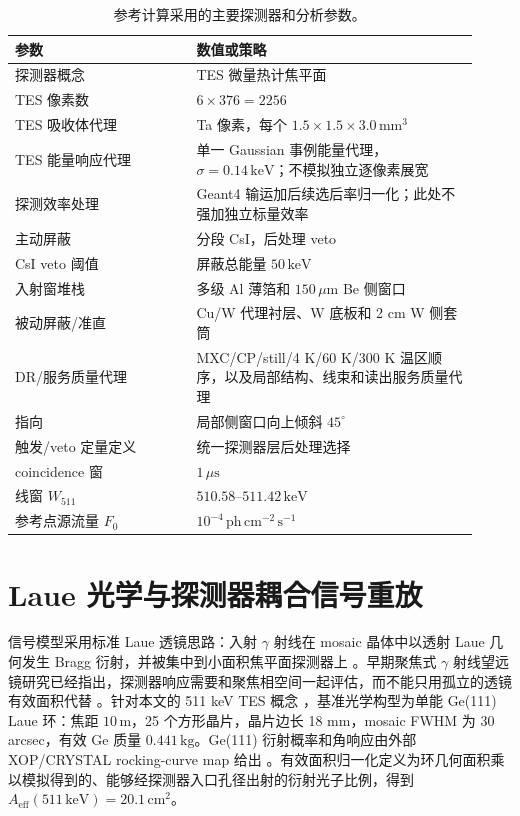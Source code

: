 \documentclass[preprint,12pt]{elsarticle}
\newcommand{\keV}{\,\mathrm{keV}}
\newcommand{\phcms}{\,\mathrm{ph\,cm^{-2}\,s^{-1}}}
\newcommand{\wii}{W_{511}}
\newcommand{\aeff}{A_{\mathrm{eff}}}
\newcommand{\fzero}{F_{0}}
\begin{document}
\begin{table}[t]
\centering
\caption{参考计算采用的主要探测器和分析参数。}
\label{tab:geometry}
\begin{tabular}{p{0.36\linewidth}p{0.56\linewidth}}
\toprule
参数 & 数值或策略 \\
\midrule
探测器概念 & TES 微量热计焦平面 \\
TES 像素数 & $6\times376=2256$ \\
TES 吸收体代理 & Ta 像素，每个 $1.5\times1.5\times3.0\,\mathrm{mm^3}$ \\
TES 能量响应代理 & 单一 Gaussian 事例能量代理，$\sigma=0.14\keV$；不模拟独立逐像素展宽 \\
探测效率处理 & Geant4 输运加后续选后率归一化；此处不强加独立标量效率 \\
主动屏蔽 & 分段 CsI，后处理 veto \\
CsI veto 阈值 & 屏蔽总能量 $50\keV$ \\
入射窗堆栈 & 多级 Al 薄箔和 $150\,\mu\mathrm{m}$ Be 侧窗口 \\
被动屏蔽/准直 & Cu/W 代理衬层、W 底板和 2 cm W 侧套筒 \\
DR/服务质量代理 & MXC/CP/still/4 K/60 K/300 K 温区顺序，以及局部结构、线束和读出服务质量代理 \\
指向 & 局部侧窗口向上倾斜 $45^\circ$ \\
触发/veto 定量定义 & 统一探测器层后处理选择 \\
coincidence 窗 & $1\,\mu\mathrm{s}$ \\
线窗 $\wii$ & $510.58$--$511.42\keV$ \\
参考点源流量 $\fzero$ & $10^{-4}\phcms$ \\
\bottomrule
\end{tabular}
\end{table}

\FloatBarrier

\section{Laue 光学与探测器耦合信号重放}
\label{sec:optics}

信号模型采用标准 Laue 透镜思路：入射 $\gamma$ 射线在 mosaic 晶体中以透射 Laue 几何发生 Bragg 衍射，并被集中到小面积焦平面探测器上 \cite{Barriere2009Laue,Barriere2011LauePrototype}。早期聚焦式 $\gamma$ 射线望远镜研究已经指出，探测器响应需要和聚焦相空间一起评估，而不能只用孤立的透镜有效面积代替 \cite{Weidenspointner2006MAX}。针对本文的 511 keV TES 概念 \cite{Shirazi2023}，基准光学构型为单能 Ge(111) Laue 环：焦距 $10\,\mathrm{m}$，25 个方形晶片，晶片边长 18 mm，mosaic FWHM 为 30 arcsec，有效 Ge 质量 $0.441\,\mathrm{kg}$。Ge(111) 衍射概率和角响应由外部 XOP/CRYSTAL rocking-curve map 给出 \cite{SanchezDelRio2011XOP}。有效面积归一化定义为环几何面积乘以模拟得到的、能够经探测器入口孔径出射的衍射光子比例，得到 $\aeff(511\keV)=20.1\,\mathrm{cm^2}$。
\end{document}
